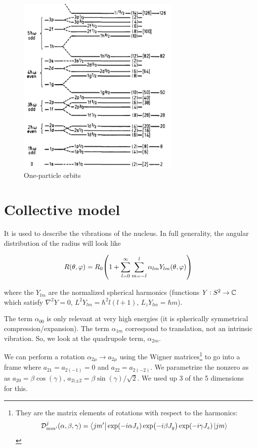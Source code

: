 \documentclass{article}
\begin{document}
\begin{figure}[H]
    \centering
    \includegraphics[width=0.7\textwidth]{../figures/nuclear_shells.png}
    \caption{One-particle orbits}
    \label{fig:shell-orbits}
\end{figure}

\section{Collective model}

It is used to describe the vibrations of the nucleus.
In full generality, the angular distribution of the radius will look like

\begin{equation}
    R (\theta, \varphi) = R_0 \qty(1 + \sum _{l=0}   ^{\infty} \sum _{m=-l}   ^{l} \alpha_{lm} Y_{lm} (\theta, \varphi))
\end{equation}

where the \(Y_{lm}\) are the normalized spherical harmonics (functions \(Y: S^2 \rightarrow \mathbb{C}\) which satisfy \(\nabla^2 Y = 0\), \(L^2 Y_{lm} = \hbar^2 l (l+1)\), \(L_z Y_{lm} = \hbar m\)).

The term \(\alpha_{00}\) is only relevant at very high energies (it is spherically symmetrical compression/expansion). The term \(\alpha_{1m}\) correspond to translation, not an intrinsic vibration. So, we look at the quadrupole term, \(\alpha_{2m}\).

We can perform a rotation \(\alpha_{2 \mu} \rightarrow a _{2 \mu} \) using the Wigner matrices\footnote{They are the matrix elements of rotations with respect to the harmonics:
\begin{equation}
    \mathcal D^j_{mm'}(\alpha, \beta, \gamma) = \bra{jm'} \exp(-i \alpha J_z) \exp(-i \beta J_y) \exp(-i \gamma J_z) \ket{jm}
\end{equation}
}
to go into a frame where \(a_{21} = a_{2(-1)} = 0\) and \(a_{22} = a_{2(-2)}\). We parametrize the nonzero \(a\)s as \(a_{20} = \beta \cos(\gamma) \), \(a_{2(\pm 2} = \beta \sin(\gamma) / \sqrt{2}\). We used up 3 of the 5 dimensions for this.
\end{document}
